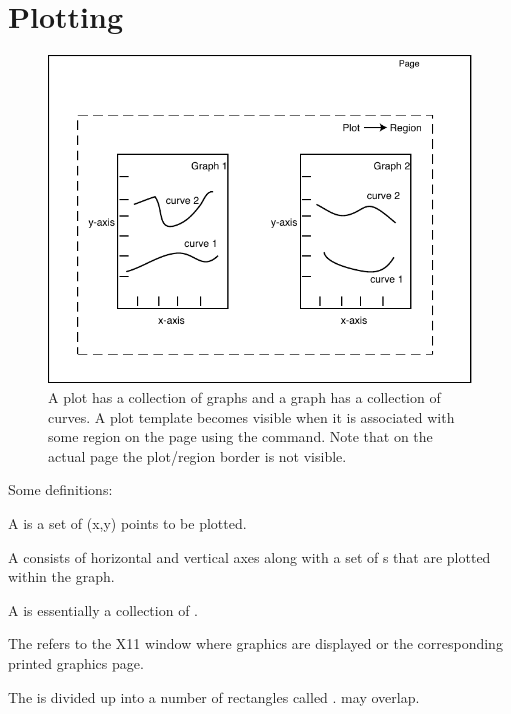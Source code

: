 \chapter{Plotting}
\label{c:plotting}

\begin{figure}[tb]
  \centering
  \includegraphics{plot.pdf}
  \caption[A plot has a collection of graphs.]
{A plot has a collection of graphs and a graph has a collection of curves. A plot template becomes
visible when it is associated with some region on the page using the  command. Note that
on the actual page the plot/region border is not visible.}
  \label{f:plot}
\end{figure}

Some definitions:
  \vspace*{-3ex}
\begin{description}
\item[Curve] \Newline
A  is a set of (x,y) points to be plotted.
\item[Graph] \Newline
A  consists of horizontal and vertical axes along with a set
of s that are plotted within the graph. 
\item[Plot] \Newline
A  is essentially a collection of .
\item[Page] \Newline
The  refers to the X11 window where graphics are displayed or the 
corresponding printed graphics page.
\item[Region] \Newline
The  is divided up into a number of rectangles called
.  may overlap.
\end{description}

